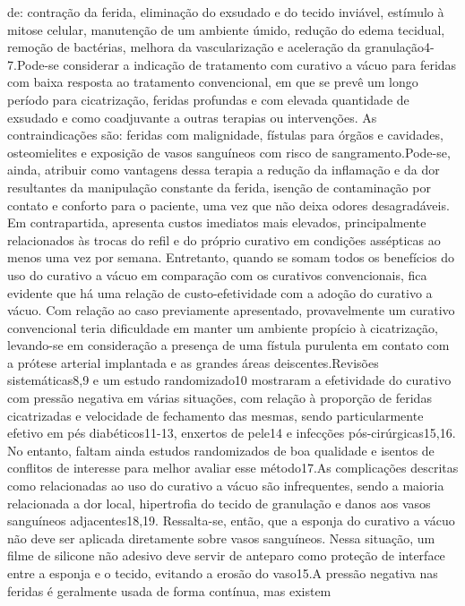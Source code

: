 \documentclass[numberinsection,times,10pt,spreadimages]{memoir}
\begin{document}
de: contração da ferida, eliminação do exsudado e do tecido inviável, estímulo à
mitose celular, manutenção de um ambiente úmido, redução do edema tecidual,
remoção
de bactérias, melhora da vascularização e aceleração da granulação4-7.Pode-se
considerar a indicação de tratamento com curativo a vácuo para feridas com
baixa resposta ao tratamento convencional, em que se prevê um longo período para
cicatrização, feridas profundas e com elevada quantidade de exsudado e como
coadjuvante a outras terapias ou intervenções. As contraindicações são: feridas
com
malignidade, fístulas para órgãos e cavidades, osteomielites e exposição de
vasos
sanguíneos com risco de sangramento.Pode-se, ainda, atribuir como vantagens
dessa terapia a redução da inflamação e da
dor resultantes da manipulação constante da ferida, isenção de contaminação por
contato e conforto para o paciente, uma vez que não deixa odores desagradáveis.
Em
contrapartida, apresenta custos imediatos mais elevados, principalmente
relacionados
às trocas do refil e do próprio curativo em condições assépticas ao menos uma
vez
por semana. Entretanto, quando se somam todos os benefícios do uso do curativo a
vácuo em comparação com os curativos convencionais, fica evidente que há uma
relação
de custo-efetividade com a adoção do curativo a vácuo. Com relação ao caso
previamente apresentado, provavelmente um curativo convencional teria
dificuldade em
manter um ambiente propício à cicatrização, levando-se em consideração a
presença de
uma fístula purulenta em contato com a prótese arterial implantada e as grandes
áreas deiscentes.Revisões sistemáticas8,9 e um estudo randomizado10 mostraram a
efetividade do curativo com pressão
negativa em várias situações, com relação à proporção de feridas cicatrizadas e
velocidade de fechamento das mesmas, sendo particularmente efetivo em pés
diabéticos11-13, enxertos de pele14 e infecções pós-cirúrgicas15,16. No entanto,
faltam ainda estudos randomizados
de boa qualidade e isentos de conflitos de interesse para melhor avaliar esse
método17.As complicações descritas como relacionadas ao uso do curativo a vácuo
são
infrequentes, sendo a maioria relacionada a dor local, hipertrofia do tecido de
granulação e danos aos vasos sanguíneos adjacentes18,19. Ressalta-se, então, que
a esponja do curativo a vácuo
não deve ser aplicada diretamente sobre vasos sanguíneos. Nessa situação, um
filme
de silicone não adesivo deve servir de anteparo como proteção de interface entre
a
esponja e o tecido, evitando a erosão do vaso15.A pressão negativa nas feridas é
geralmente usada de forma contínua, mas existem
\end{document}
